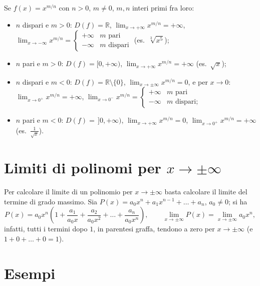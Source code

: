 \documentclass[11pt,a4paper]{article}
\begin{document}
Se $f(x) = x^{m/n}$ con $n > 0$, $m \neq 0$, $m, n$ interi primi fra loro:
\begin{itemize}
    \item $n$ dispari e $m > 0$: $D(f) = \mathbb{R}$, $\displaystyle\lim_{x\to+\infty} x^{m/n} = +\infty$, $\displaystyle\lim_{x\to-\infty} x^{m/n} = \begin{cases} +\infty & m \text{ pari} \\ -\infty & m \text{ dispari} \end{cases}$ \quad (es.\ $\sqrt[3]{x^5}$);
    \item $n$ pari e $m > 0$: $D(f) = [0, +\infty)$, $\displaystyle\lim_{x\to+\infty} x^{m/n} = +\infty$ (es.\ $\sqrt{x}$);
    \item $n$ dispari e $m < 0$: $D(f) = \mathbb{R}\setminus\{0\}$, $\displaystyle\lim_{x\to\pm\infty} x^{m/n} = 0$, e per $x \to 0$: $\displaystyle\lim_{x\to 0^+} x^{m/n} = +\infty$, $\displaystyle\lim_{x\to 0^-} x^{m/n} = \begin{cases} +\infty & m \text{ pari} \\ -\infty & m \text{ dispari;} \end{cases}$
    \item $n$ pari e $m < 0$: $D(f) = \,]0, +\infty)$, $\displaystyle\lim_{x\to+\infty} x^{m/n} = 0$, $\displaystyle\lim_{x\to 0^+} x^{m/n} = +\infty$ (es.\ $\frac{1}{\sqrt x}$).
\end{itemize}

\section{Limiti di polinomi per $x \to \pm\infty$}

Per calcolare il limite di un polinomio per $x \to \pm\infty$ basta calcolare il limite del termine di grado massimo. Sia $P(x) = a_0 x^n + a_1 x^{n-1} + \dots + a_n$, $a_0 \neq 0$; si ha
\[
P(x) = a_0 x^n \left( 1 + \frac{a_1}{a_0 x} + \frac{a_2}{a_0 x^2} + \dots + \frac{a_n}{a_0 x^n} \right),
\qquad
\lim_{x\to\pm\infty} P(x) = \lim_{x\to\pm\infty} a_0 x^n ,
\]
infatti, tutti i termini dopo $1$, in parentesi graffa, tendono a zero per $x \to \pm\infty$ (e $1 + 0 + \dots + 0 = 1$).

\section{Esempi}
\end{document}
